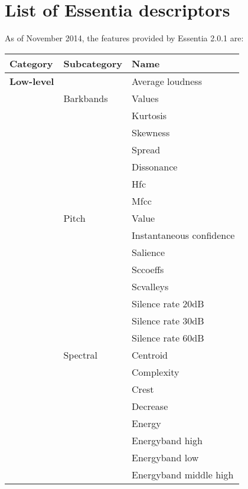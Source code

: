 \chapter{List of Essentia descriptors} 

\label{AppendixA}

As of November 2014, the features provided by Essentia 2.0.1 are:

\begin{center}
\begin{longtable}{ p{} p{} p{} } 

\textbf{Category} & \textbf{Subcategory} & \textbf{Name} \\ \toprule
\textbf{Low-level} & & Average loudness \\ \cmidrule(r){2-3}
& Barkbands & Values\\ \cmidrule(r){3-3}
&  & Kurtosis \\ \cmidrule(r){3-3} 
&  & Skewness \\ \cmidrule(r){3-3}
&  & Spread \\ \cmidrule(r){2-3}
& & Dissonance \\ \cmidrule(r){2-3}
& & Hfc \\ \cmidrule(r){2-3}
& & Mfcc \\ \cmidrule(r){2-3}
& Pitch & Value\\ \cmidrule(r){3-3}
& & Instantaneous confidence \\ \cmidrule(r){3-3}
& & Salience \\ \cmidrule(r){2-3}
& & Sccoeffs \\ \cmidrule(r){2-3}
& & Scvalleys \\ \cmidrule(r){2-3}
& & Silence rate 20dB \\ \cmidrule(r){2-3}
& & Silence rate 30dB \\ \cmidrule(r){2-3}
& & Silence rate 60dB \\ \cmidrule(r){2-3}
& Spectral & Centroid \\ \cmidrule(r){3-3}
& & Complexity \\ \cmidrule(r){3-3}
& & Crest \\ \cmidrule(r){3-3}
& & Decrease \\ \cmidrule(r){3-3}
& & Energy \\ \cmidrule(r){3-3}
& & Energyband high \\ \cmidrule(r){3-3}
& & Energyband low \\ \cmidrule(r){3-3}
& & Energyband middle high \\ \cmidrule(r){3-3}

\end{longtable}
\end{center}
